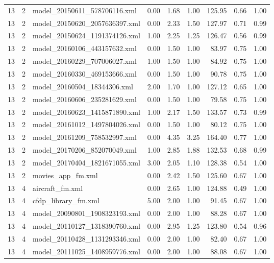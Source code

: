 \begin{table}[ht]
\begin{tabular}{rrlrrrrrr}
   13 &   2 & model\_20150611\_578706116.xml & 0.00 & 1.68 & 1.00 & 125.95 & 0.66 & 1.00 \\ 
   13 &   2 & model\_20150620\_2057636397.xml & 0.00 & 2.33 & 1.50 & 127.97 & 0.71 & 0.99 \\ 
   13 &   2 & model\_20150624\_1191374126.xml & 1.00 & 2.25 & 1.25 & 126.47 & 0.56 & 0.99 \\ 
   13 &   2 & model\_20160106\_443157632.xml & 0.00 & 1.50 & 1.00 & 83.97 & 0.75 & 1.00 \\ 
   13 &   2 & model\_20160229\_707006027.xml & 1.00 & 1.50 & 1.00 & 84.92 & 0.75 & 1.00 \\ 
   13 &   2 & model\_20160330\_469153666.xml & 0.00 & 1.50 & 1.00 & 90.78 & 0.75 & 1.00 \\ 
   13 &   2 & model\_20160504\_18344306.xml & 2.00 & 1.70 & 1.00 & 127.12 & 0.65 & 1.00 \\ 
   13 &   2 & model\_20160606\_235281629.xml & 0.00 & 1.50 & 1.00 & 79.58 & 0.75 & 1.00 \\ 
   13 &   2 & model\_20160623\_1415871890.xml & 1.00 & 2.17 & 1.50 & 133.57 & 0.73 & 0.99 \\ 
   13 &   2 & model\_20161012\_1497804026.xml & 0.00 & 1.50 & 1.00 & 80.12 & 0.75 & 1.00 \\ 
   13 &   2 & model\_20161209\_758532997.xml & 0.00 & 4.35 & 3.25 & 164.40 & 0.77 & 1.00 \\ 
   13 &   2 & model\_20170206\_852070049.xml & 1.00 & 2.85 & 1.88 & 132.53 & 0.68 & 0.99 \\ 
   13 &   2 & model\_20170404\_1821671055.xml & 3.00 & 2.05 & 1.10 & 128.38 & 0.54 & 1.00 \\ 
   13 &   2 & movies\_app\_fm.xml & 0.00 & 2.42 & 1.50 & 125.60 & 0.67 & 1.00 \\ 
   13 &   4 & aircraft\_fm.xml & 0.00 & 2.65 & 1.00 & 124.88 & 0.49 & 1.00 \\ 
   13 &   4 & cfdp\_library\_fm.xml & 5.00 & 2.00 & 1.00 & 91.45 & 0.67 & 1.00 \\ 
   13 &   4 & model\_20090801\_1908323193.xml & 0.00 & 2.00 & 1.00 & 88.28 & 0.67 & 1.00 \\ 
   13 &   4 & model\_20110127\_1318390760.xml & 0.00 & 2.95 & 1.25 & 123.80 & 0.54 & 0.96 \\ 
   13 &   4 & model\_20110428\_1131293346.xml & 0.00 & 2.00 & 1.00 & 82.40 & 0.67 & 1.00 \\ 
   13 &   4 & model\_20111025\_1408959776.xml & 0.00 & 2.00 & 1.00 & 88.08 & 0.67 & 1.00 \\ 

\end{tabular}
\end{table}

